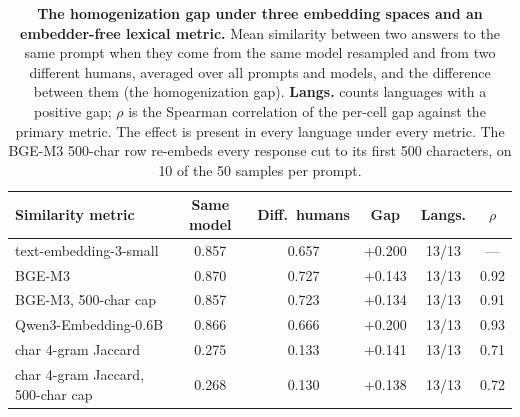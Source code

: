 \begin{table}[t]
\centering
\caption{\textbf{The homogenization gap under three embedding spaces and an embedder-free lexical metric.} Mean similarity between two answers to the same prompt when they come from the same model resampled and from two different humans, averaged over all prompts and models, and the difference between them (the homogenization gap). \textbf{Langs.} counts languages with a positive gap; $\rho$ is the Spearman correlation of the per-cell gap against the primary metric. The effect is present in every language under every metric. The BGE-M3 500-char row re-embeds every response cut to its first 500 characters, on 10 of the 50 samples per prompt.}
\small
\setlength{\tabcolsep}{4pt}
\begin{tabular}{@{}lccccc@{}}
\toprule
\textbf{Similarity metric} & \textbf{Same model} & \textbf{Diff.\ humans} & \textbf{Gap} & \textbf{Langs.} & \textbf{$\rho$} \\
\midrule
text-embedding-3-small & 0.857 & 0.657 & +0.200 & 13/13 & --- \\
BGE-M3 & 0.870 & 0.727 & +0.143 & 13/13 & 0.92 \\
BGE-M3, 500-char cap & 0.857 & 0.723 & +0.134 & 13/13 & 0.91 \\
Qwen3-Embedding-0.6B & 0.866 & 0.666 & +0.200 & 13/13 & 0.93 \\
char 4-gram Jaccard & 0.275 & 0.133 & +0.141 & 13/13 & 0.71 \\
char 4-gram Jaccard, 500-char cap & 0.268 & 0.130 & +0.138 & 13/13 & 0.72 \\
\bottomrule
\end{tabular}
\label{tab:robustness}
\end{table}
